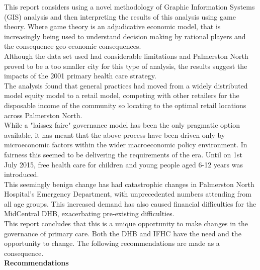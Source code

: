 \documentclass[11pt,a4paper]{article}
\begin{document}
This report considers using a novel methodology of Graphic Information Systems (GIS) analysis and then interpreting the results of this analysis using game theory. Where game theory is an adjudicative economic model, that is increasingly being used to understand decision making by rational players and the consequence geo-economic consequences. \\

Although the data set used had considerable limitations and Palmerston North proved to be a too smaller city for this type of analysis, the results suggest the impacts of the 2001 primary health care strategy.\\ 

The analysis found that general practices had moved from a widely distributed model equity model to a retail model, competing with other retailers for the disposable income of the community so locating to the optimal retail locations across Palmerston North.\\

While a "laissez faire" governance model has been the only pragmatic option available, it has meant that the above process have been driven only by microeconomic factors within the wider macroeconomic policy environment. In fairness this seemed to be delivering the requirements of the era. Until on 1st July 2015, free health care for children and young people aged 6-12 years was introduced. \\

This seemingly benign change has had catastrophic changes in Palmerston North Hospital's Emergency Department, with unprecedented numbers attending from all age groups. This increased demand has also caused financial difficulties for the MidCentral DHB, exacerbating pre-existing difficulties.\\

This report concludes that this is a unique opportunity to make changes in the governance of primary care. Both the DHB and IFHC have the need and the opportunity to change. The following recommendations are made as a consequence.\\

\textbf{Recommendations}
 
\end{document}
